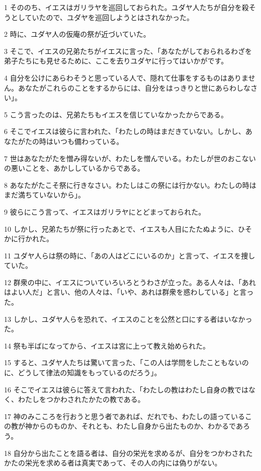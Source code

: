 \par 1 そののち、イエスはガリラヤを巡回しておられた。ユダヤ人たちが自分を殺そうとしていたので、ユダヤを巡回しようとはされなかった。
\par 2 時に、ユダヤ人の仮庵の祭が近づいていた。
\par 3 そこで、イエスの兄弟たちがイエスに言った、「あなたがしておられるわざを弟子たちにも見せるために、ここを去りユダヤに行ってはいかがです。
\par 4 自分を公けにあらわそうと思っている人で、隠れて仕事をするものはありません。あなたがこれらのことをするからには、自分をはっきりと世にあらわしなさい」。
\par 5 こう言ったのは、兄弟たちもイエスを信じていなかったからである。
\par 6 そこでイエスは彼らに言われた、「わたしの時はまだきていない。しかし、あなたがたの時はいつも備わっている。
\par 7 世はあなたがたを憎み得ないが、わたしを憎んでいる。わたしが世のおこないの悪いことを、あかししているからである。
\par 8 あなたがたこそ祭に行きなさい。わたしはこの祭には行かない。わたしの時はまだ満ちていないから」。
\par 9 彼らにこう言って、イエスはガリラヤにとどまっておられた。
\par 10 しかし、兄弟たちが祭に行ったあとで、イエスも人目にたたぬように、ひそかに行かれた。
\par 11 ユダヤ人らは祭の時に、「あの人はどこにいるのか」と言って、イエスを捜していた。
\par 12 群衆の中に、イエスについていろいろとうわさが立った。ある人々は、「あれはよい人だ」と言い、他の人々は、「いや、あれは群衆を惑わしている」と言った。
\par 13 しかし、ユダヤ人らを恐れて、イエスのことを公然と口にする者はいなかった。
\par 14 祭も半ばになってから、イエスは宮に上って教え始められた。
\par 15 すると、ユダヤ人たちは驚いて言った、「この人は学問をしたこともないのに、どうして律法の知識をもっているのだろう」。
\par 16 そこでイエスは彼らに答えて言われた、「わたしの教はわたし自身の教ではなく、わたしをつかわされたかたの教である。
\par 17 神のみこころを行おうと思う者であれば、だれでも、わたしの語っているこの教が神からのものか、それとも、わたし自身から出たものか、わかるであろう。
\par 18 自分から出たことを語る者は、自分の栄光を求めるが、自分をつかわされたかたの栄光を求める者は真実であって、その人の内には偽りがない。
